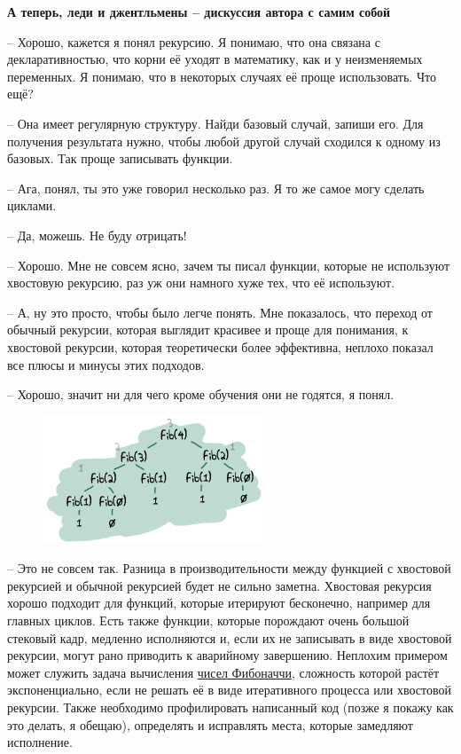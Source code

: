 \documentclass[a4paper,12pt]{report}
\begin{document}
\textbf{А теперь, леди и джентльмены \--- дискуссия автора с самим собой}

\--- Хорошо, кажется я понял рекурсию. Я понимаю, что она связана с декларативностью, что корни её уходят в математику, как и у неизменяемых переменных. Я понимаю, что в некоторых случаях её проще использовать. Что ещё?

\--- Она имеет регулярную структуру. Найди базовый случай, запиши его. Для получения результата нужно, чтобы любой другой случай сходился к одному из базовых. Так проще записывать функции.

\--- Ага, понял, ты это уже говорил несколько раз. Я то же самое могу сделать циклами.

\--- Да, можешь. Не буду отрицать!

\--- Хорошо. Мне не совсем ясно, зачем ты писал функции, которые не используют хвостовую рекурсию, раз уж они намного хуже тех, что её используют.

\--- А, ну это просто, чтобы было легче понять. Мне показалось, что переход от обычный рекурсии, которая выглядит красивее и проще для понимания, к хвостовой рекурсии, которая теоретически более эффективна, неплохо показал все плюсы и минусы этих подходов.

\--- Хорошо, значит ни для чего кроме обучения они не годятся, я понял.
\begin{figure}
    \includegraphics[width=1\linewidth]{fib.png}
\end{figure}

\--- Это не совсем так. Разница в производительности между функцией с хвостовой рекурсией и обычной рекурсией будет не сильно заметна. Хвостовая рекурсия хорошо подходит для функций, которые итерируют бесконечно, например для главных циклов. Есть также функции, которые порождают очень большой стековый кадр, медленно исполняются и, если их не записывать в виде хвостовой рекурсии, могут рано приводить к аварийному завершению. Неплохим примером может служить задача вычисления \href{http://en.wikipedia.org/wiki/Fibonacci\_number}{чисел Фибоначчи}, сложность которой растёт экспоненциально, если не решать её в виде итеративного процесса или хвостовой рекурсии. Также необходимо профилировать написанный код (позже я покажу как это делать, я обещаю), определять и исправлять места, которые замедляют исполнение.
\end{document}
